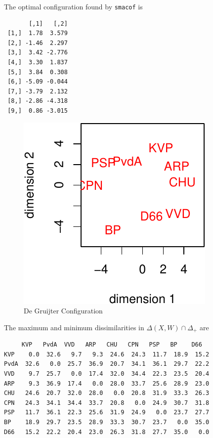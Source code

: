\documentclass[
  12pt,
  letterpaper,
  DIV=11,
  numbers=noendperiod]{scrreprt}
\theoremstyle{remark}
\begin{document}
The optimal configuration found by \texttt{smacof} is

\begin{verbatim}
       [,1]   [,2]
 [1,]  1.78  3.579
 [2,] -1.46  2.297
 [3,]  3.42 -2.776
 [4,]  3.30  1.837
 [5,]  3.84  0.308
 [6,] -5.09 -0.044
 [7,] -3.79  2.132
 [8,] -2.86 -4.318
 [9,]  0.86 -3.015
\end{verbatim}

\begin{figure}[H]

{\centering \includegraphics{inverse_files/figure-pdf/poldistconfplot-1.pdf}

}

\caption{De Gruijter Configuration}

\end{figure}%

The maximum and minimum dissimilarities in \(\Delta(X,W)\cap\Delta_+\)
are

\begin{verbatim}
     KVP   PvdA  VVD   ARP   CHU   CPN   PSP   BP    D66  
KVP    0.0  32.6   9.7   9.3  24.6  24.3  11.7  18.9  15.2
PvdA  32.6   0.0  25.7  36.9  20.7  34.1  36.1  29.7  22.2
VVD    9.7  25.7   0.0  17.4  32.0  34.4  22.3  23.5  20.4
ARP    9.3  36.9  17.4   0.0  28.0  33.7  25.6  28.9  23.0
CHU   24.6  20.7  32.0  28.0   0.0  20.8  31.9  33.3  26.3
CPN   24.3  34.1  34.4  33.7  20.8   0.0  24.9  30.7  31.8
PSP   11.7  36.1  22.3  25.6  31.9  24.9   0.0  23.7  27.7
BP    18.9  29.7  23.5  28.9  33.3  30.7  23.7   0.0  35.0
D66   15.2  22.2  20.4  23.0  26.3  31.8  27.7  35.0   0.0
\end{verbatim}
\end{document}
